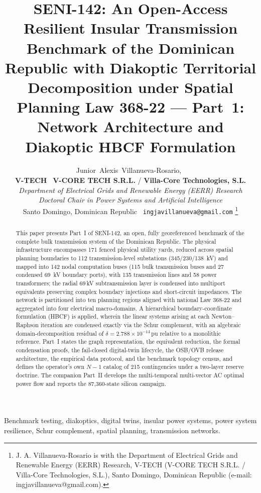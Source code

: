\documentclass[11pt, journal, onecolumn]{IEEEtran}
\title{SENI-142: An Open-Access Resilient Insular Transmission Benchmark of the Dominican Republic with Diakoptic Territorial Decomposition under Spatial Planning Law 368-22 --- Part~1: Network Architecture and Diakoptic HBCF Formulation}
\author{Junior~Alexis~Villanueva-Rosario,~\IEEEmembership{Ms.C., Ph.D.(c)}\\[0.3em]
{\normalsize\textnormal{\textbf{V-TECH} \textbar\ \textbf{V-CORE TECH S.R.L.} / \textbf{Villa-Core Technologies, S.L.}}}\\[0.15em]
{\footnotesize\textnormal{\textit{Department of Electrical Grids and Renewable Energy (EERR) Research}}}\\[0.15em]
{\footnotesize\textnormal{\textit{Doctoral Chair in Power Systems and Artificial Intelligence}}}\\[0.15em]
{\footnotesize\textnormal{Santo Domingo, Dominican Republic \textbar\ \texttt{ingjavillanueva@gmail.com}}}%
\thanks{J. A. Villanueva-Rosario is with the Department of Electrical Grids and Renewable Energy (EERR) Research, V-TECH (V-CORE TECH S.R.L. / Villa-Core Technologies, S.L.), Santo Domingo, Dominican Republic (e-mail: ingjavillanueva@gmail.com).}}
\begin{document}
\maketitle
\begin{abstract}
This paper presents Part~I of SENI-142, an open, fully georeferenced benchmark of the complete bulk transmission system of the Dominican Republic. The physical infrastructure encompasses 171 fenced physical utility yards, reduced across spatial planning boundaries to 112 transmission-level substations (345/230/138~kV) and mapped into 142 nodal computation buses (115 bulk transmission buses and 27 condensed 69~kV boundary ports), with 135 transmission lines and 58 power transformers; the radial 69\,kV subtransmission layer is condensed into multiport equivalents preserving complex boundary injections and short-circuit impedances. The network is partitioned into ten planning regions aligned with national Law 368-22 and aggregated into four electrical macro-domains. A hierarchical boundary-coordinate formulation (HBCF) is applied, wherein the linear systems arising at each Newton--Raphson iteration are condensed exactly via the Schur complement, with an algebraic domain-decomposition residual of $\delta = 2.788 \times 10^{-14}$\,pu relative to a monolithic reference. Part~I states the graph representation, the equivalent reduction, the formal condensation proofs, the fail-closed digital-twin lifecycle, the OSB/OVB release architecture, the empirical data protocol, and the benchmark topology census, and defines the operator's own $N-1$ catalog of 215 contingencies under a two-layer reserve doctrine. The companion Part~II develops the multi-temporal multi-vector AC optimal power flow and reports the 87,360-state silicon campaign.
\end{abstract}

\begin{IEEEkeywords}
Benchmark testing, diakoptics, digital twins, insular power systems, power system resilience, Schur complement, spatial planning, transmission networks.
\end{IEEEkeywords}

\setlength{\textfloatsep}{12pt plus 2pt minus 4pt}%
\setlength{\dbltextfloatsep}{12pt plus 2pt minus 4pt}%
\setlength{\abovedisplayskip}{7pt plus 2pt minus 3pt}%
\setlength{\belowdisplayskip}{7pt plus 2pt minus 3pt}%
\setlength{\abovedisplayshortskip}{3pt plus 1pt minus 2pt}%
\setlength{\belowdisplayshortskip}{4pt plus 1pt minus 2pt}%
\end{document}
